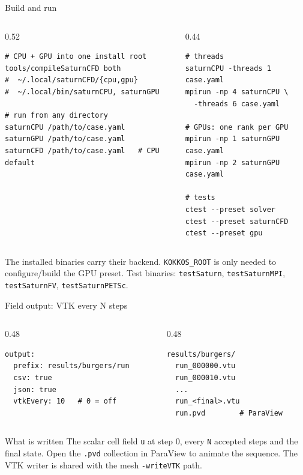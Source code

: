 \documentclass[aspectratio=169,10pt]{beamer}
\begin{document}
\begin{frame}[fragile]{Build and run}
  \begin{columns}[T]
    \begin{column}{0.52\textwidth}
\begin{lstlisting}
# CPU + GPU into one install root
tools/compileSaturnCFD both
#  ~/.local/saturnCFD/{cpu,gpu}
#  ~/.local/bin/saturnCPU, saturnGPU

# run from any directory
saturnCPU /path/to/case.yaml
saturnGPU /path/to/case.yaml
saturnCFD /path/to/case.yaml   # CPU default
\end{lstlisting}
    \end{column}
    \begin{column}{0.44\textwidth}
\begin{lstlisting}
# threads
saturnCPU -threads 1 case.yaml
mpirun -np 4 saturnCPU \
  -threads 6 case.yaml

# GPUs: one rank per GPU
mpirun -np 1 saturnGPU case.yaml
mpirun -np 2 saturnGPU case.yaml

# tests
ctest --preset solver
ctest --preset saturnCFD
ctest --preset gpu
\end{lstlisting}
    \end{column}
  \end{columns}

  \vspace{0.4em}
  \small
  The installed binaries carry their backend. \texttt{KOKKOS\_ROOT} is only
  needed to configure/build the GPU preset. Test binaries:
  \texttt{testSaturn}, \texttt{testSaturnMPI}, \texttt{testSaturnFV},
  \texttt{testSaturnPETSc}.
\end{frame}

\begin{frame}[fragile]{Field output: VTK every N steps}
  \begin{columns}[T]
    \begin{column}{0.48\textwidth}
\begin{lstlisting}
output:
  prefix: results/burgers/run
  csv: true
  json: true
  vtkEvery: 10   # 0 = off
\end{lstlisting}
    \end{column}
    \begin{column}{0.48\textwidth}
\begin{lstlisting}
results/burgers/
  run_000000.vtu
  run_000010.vtu
  ...
  run_<final>.vtu
  run.pvd        # ParaView
\end{lstlisting}
    \end{column}
  \end{columns}

  \vspace{0.6em}
  \begin{block}{What is written}
    The scalar cell field \texttt{u} at step 0, every \texttt{N} accepted
    steps and the final state. Open the \texttt{.pvd} collection in ParaView
    to animate the sequence. The VTK writer is shared with the mesh
    \texttt{-writeVTK} path.
  \end{block}
\end{frame}
\end{document}

